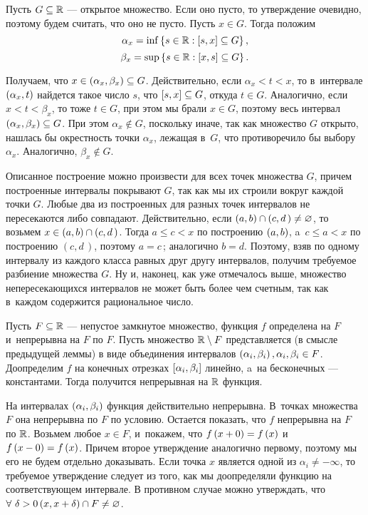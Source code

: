 \documentclass[draft]{article}
\begin{document}
\pr

Пусть $G\subseteq\mathbb{R}$ --- открытое множество. Если оно пусто, то
утверждение очевидно, поэтому будем считать, что оно не пусто. Пусть
$x\in G$. Тогда положим
$$\alpha_x=\inf\set{s\in\reals:\seg[s,x]\subseteq G},$$
$$\beta_x=\sup\set{s\in\reals:\seg[x,s]\subseteq G}.$$

Получаем, что $x\in\at(\alpha_x,\beta_x)\subseteq G$. Действительно,
если $\alpha_x<t<x$, то в~интервале $\at(\alpha_x,t)$ найдется такое
число $s$, что $\seg[s,x]\subseteq G$, откуда $t\in G$. Аналогично,
если $x<t<\beta_x$, то тоже $t\in G$, при этом мы брали $x\in G$,
поэтому весь интервал $\at(\alpha_x,\beta_x)\subseteq G$. При этом
$\alpha_x\notin G$, поскольку иначе, так как множество $G$ открыто,
нашлась бы окрестность точки $\alpha_x$, лежащая в~$G$, что
противоречило бы выбору $\alpha_x$. Аналогично, $\beta_x\notin G$.

\smallskip

Описанное построение можно произвести для всех точек множества $G$,
причем построенные интервалы покрывают $G$, так как мы их строили
вокруг каждой точки $G$. Любые два из построенных для разных точек
интервалов не пересекаются либо совпадают. Действительно, если
$\at(a,b)\cap\at(c,d\,)\neq\varnothing$, то возьмем
$x \in\at(a,b)\cap\at(c,d\,)$. Тогда $a\le c<x$ по построению
$\at(a,b)$, a~$c\le a<x$ по построению $(c,d\,)$, поэтому
$a = c$\,; аналогично $b = d$. Поэтому, взяв по одному интервалу
из каждого класса равных друг другу интервалов, получим требуемое
разбиение множества $G$. Ну и, наконец, как уже отмечалось выше,
множество непересекающихся интервалов не может быть более чем
счетным, так как в~каждом содержится рациональное число.

\prlm

\eject


Пусть $F\subseteq\mathbb{R}$ --- непустое замкнутое множество, функция
$f$ определена на $F$ и~непрерывна на $F$ по $F$. Пусть множество
$\mathbb{R}\setminus F$ представляется (в смысле предыдущей леммы) в
виде объединения интервалов $\at(\alpha_i,\beta_i),
\alpha_i,\beta_i\in F$. Доопределим $f$ на конечных отрезках
$\seg[\alpha_i,\beta_i]$ линейно, a~на бесконечных --- константами.
Тогда получится непрерывная на $\mathbb{R}$ функция.

\pr

На интервалах $\at(\alpha_i,\beta_i)$ функция действительно
непрерывна. В~точках множества $F$ она непрерывна по $F$ по условию.
Остается показать, что $f$ непрерывна на $F$ по $\mathbb{R}$. Возьмем
любое $x\in F$, и~покажем, что $f\at(x+0)=f\at(x)$ и
$f\at(x-0)=f\at(x)$. Причем второе утверждение аналогично первому,
поэтому мы его не будем отдельно доказывать. Если точка $x$ является
одной из $\alpha_i \neq -\infty$, то требуемое утверждение следует
из того, как мы доопределяли функцию на соответствующем интервале. В
противном случае можно утверждать, что $\forall\ \degz \at(x,x+\de)\cap F\neq\varnothing$.
\end{document}
